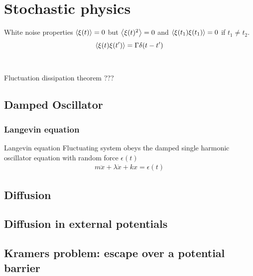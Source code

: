\documentclass[12pt,a4paper]{article}
\begin{document}
\section{Stochastic physics}
    \begin{theorem}
        {White noise properties}{
        $\expval{\xi(t)}=0$ but $\expval{\xi(t)^2}=0$ and  $\expval{\xi(t_1)\xi(t_1)}=0$ if $t_1\neq t_2$.
        \begin{equation*}
            \expval{\xi(t)\xi(t')}=\Gamma\delta(t-t')
        \end{equation*}
        }
    \end{theorem}
    \\
    \begin{theorem}
        {Fluctuation dissipation theorem}{
        ???
        }
    \end{theorem}
    \subsection{Damped Oscillator}
        \subsubsection{Langevin equation}
            \begin{theorem}{Langevin equation}
                {
                Fluctuating system obeys the damped single harmonic oscillator equation with random force $\epsilon(t)$
                \begin{align*}
                    m\ddot{x}+\lambda\dot{x}+kx=\epsilon(t)
                \end{align*}
                }
            \end{theorem}
    \subsection{Diffusion}
    \subsection{Diffusion in external potentials}
    \subsection{Kramers problem: escape over a potential barrier}
\end{document}
